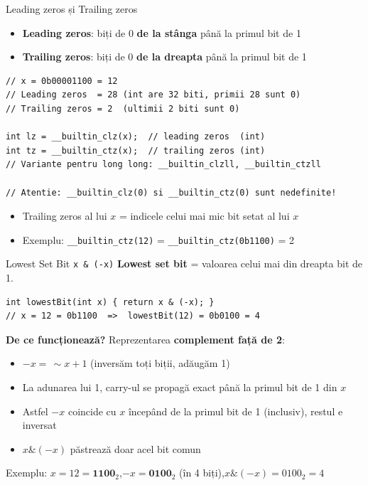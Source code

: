 \documentclass{beamer}
\begin{document}
\begin{frame}{Leading zeros și Trailing zeros}
  \begin{itemize}
    \item \textbf{Leading zeros}: biți de 0 \textbf{de la stânga} până la primul bit de 1
    \item \textbf{Trailing zeros}: biți de 0 \textbf{de la dreapta} până la primul bit de 1
  \end{itemize}
  \begin{center}
  \begin{lstlisting}
// x = 0b00001100 = 12
// Leading zeros  = 28 (int are 32 biti, primii 28 sunt 0)
// Trailing zeros = 2  (ultimii 2 biti sunt 0)

int lz = __builtin_clz(x);  // leading zeros  (int)
int tz = __builtin_ctz(x);  // trailing zeros (int)
// Variante pentru long long: __builtin_clzll, __builtin_ctzll

// Atentie: __builtin_clz(0) si __builtin_ctz(0) sunt nedefinite!
  \end{lstlisting}
  \end{center}
  \begin{itemize}
    \item Trailing zeros al lui $x$ = indicele celui mai mic bit setat al lui $x$
    \item Exemplu: \lstinline|__builtin_ctz(12)| = \lstinline|__builtin_ctz(0b1100)| = 2
  \end{itemize}
\end{frame}

\begin{frame}{Lowest Set Bit \textemdash{} \lstinline|x & (-x)|}
  \textbf{Lowest set bit} = valoarea celui mai din dreapta bit de 1.

  \begin{center}
  \begin{lstlisting}
int lowestBit(int x) { return x & (-x); }
// x = 12 = 0b1100  =>  lowestBit(12) = 0b0100 = 4
  \end{lstlisting}
  \end{center}
  \medskip
  \textbf{De ce funcționează?} \textemdash{} Reprezentarea \textbf{complement față de 2}:
  \begin{itemize}
    \item $-x = \,\sim\! x + 1$ (inversăm toți biții, adăugăm 1)
    \item La adunarea lui 1, carry-ul se propagă exact până la primul bit de 1 din $x$
    \item Astfel $-x$ coincide cu $x$ începând de la primul bit de 1 (inclusiv), restul e inversat
    \item $x \mathbin{\&} (-x)$ păstrează doar acel bit comun
  \end{itemize}
  \medskip
  Exemplu: $x = 12 = \mathbf{1100}_2$,\quad $-x = \mathbf{0100}_2$ (în 4 biți),\quad $x \mathbin{\&} (-x) = 0100_2 = 4$
\end{frame}
\end{document}
